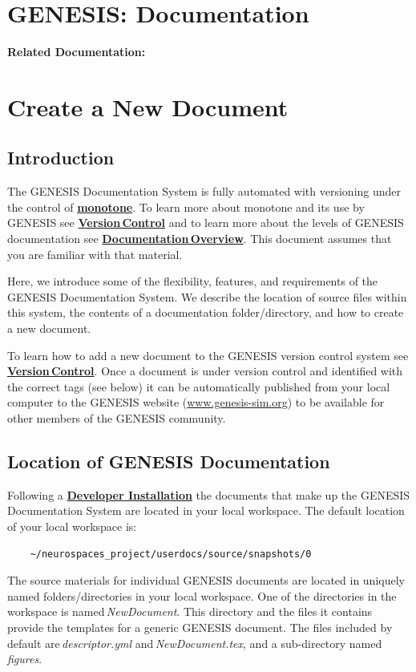 \documentclass[12pt]{article}
\begin{document}
\section*{GENESIS: Documentation}

{\bf Related Documentation:}

\section*{Create a New Document}

\subsection*{Introduction}

The GENESIS Documentation System is fully automated with versioning under the control of \href{http://monotone.ca/}{\bf monotone}. To learn more about monotone and its use by GENESIS see \href{../version-control/version-control.tex}{\bf Version\,Control} and to learn more about the levels of GENESIS documentation see \href{../documentation-overview/documentation-overview.tex}{\bf Documentation\,Overview}. This document assumes that you are familiar with that material.

Here, we introduce some of the flexibility, features, and requirements of the GENESIS Documentation System. We describe the location of source files within this system, the contents of a documentation folder/directory, and how to create a new document.

To learn how to add a new document to the GENESIS version control system see \href{../version-control/version-control.tex}{\bf Version\,Control}. Once a document is under version control and identified with the correct tags (see below) it can be automatically published from your local computer to the GENESIS website (\href{http://www.genesis-sim.org/}{www.genesis-sim.org}) to be available for other members of the GENESIS community.

\subsection*{Location of GENESIS Documentation}

Following a \href{../genesis-installation/genesis-installation.tex}{\bf Developer Installation} the documents that make up the GENESIS Documentation System are located in your local workspace. The default location of your local workspace is:
\begin{verbatim}
    ~/neurospaces_project/userdocs/source/snapshots/0
\end{verbatim}
The source materials for individual GENESIS documents are located in uniquely named folders/directories in your local workspace. One of the directories in the workspace is named\,{\it NewDocument}. This directory and the files it contains provide the templates for a generic GENESIS document. The files included by default are\,{\it descriptor.yml} and\,{\it NewDocument.tex}, and a sub-directory named\,{\it figures}.
\end{document}
